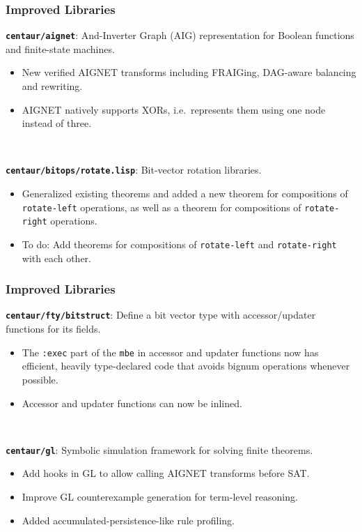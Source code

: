\documentclass{beamer}
\newcommand{\code}[1]{\texttt{#1}}
\newcommand{\bookpath}[1]{\textbf{\code{#1}}}
\newcommand{\implibtitle}{\frametitle{Improved Libraries}}
\begin{document}
\begin{frame}

\implibtitle

\bookpath{centaur/aignet}:
And-Inverter Graph (AIG) representation
for Boolean functions and finite-state machines.
\begin{itemize}
\item
New verified AIGNET transforms including FRAIGing, DAG-aware balancing
and rewriting.
\item
AIGNET natively supports XORs, i.e.\ represents them using one node
instead of three.
\end{itemize}

\

\bookpath{centaur/bitops/rotate.lisp}:
Bit-vector rotation libraries.
\begin{itemize}
\item
Generalized existing theorems and added a new theorem for compositions
of \code{rotate-left} operations, as well as a theorem for
compositions of \code{rotate-right} operations.
\item
To do: Add theorems for compositions of \code{rotate-left} and
\code{rotate-right} with each other.
\end{itemize}

\end{frame}


\begin{frame}

\implibtitle

\bookpath{centaur/fty/bitstruct}:
Define a bit vector type with accessor/updater functions for its fields.
\begin{itemize}
\item
The \code{:exec} part of the \code{mbe} in accessor and updater
functions now has efficient, heavily type-declared code that avoids
bignum operations whenever possible.
\item
Accessor and updater functions can now be inlined.
\end{itemize}

\

\bookpath{centaur/gl}:
Symbolic simulation framework for solving finite theorems.
\begin{itemize}
\item
Add hooks in GL to allow calling AIGNET transforms before SAT.
\item
Improve GL counterexample generation for term-level reasoning.
\item
Added accumulated-persistence-like rule profiling.
\end{itemize}

\end{frame}
\end{document}
